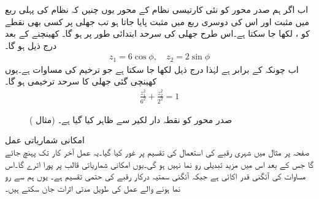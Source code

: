 اب اگر ہم صدر محور کو نئی کارتیسی نظام  کے محور یوں چنیں کہ  نظام کی پہلی ربع میں مثبت  اور اس کی دوسری ربع میں مثبت  پایا جاتا ہو تب جھلی پر کسی بھی نقطے کو ،  لکھا جا سکتا ہے۔اس طرح جھلی کی سرحد ابتدائی طور پر  ہو گا۔ کھینچنے کے بعد درج ذیل ہو گا۔
\begin{align*}
z_1=6\cos \phi,\quad z_2=2\sin \phi
\end{align*} 
اب چونکہ  کے برابر ہے لہٰذا درج ذیل لکھا جا سکتا ہے جو ترخیم کی مساوات ہے۔یوں کھینچی گئی جھلی کا سرحد ترخیمی ہو گا۔
\begin{align*}
\frac{z_1^2}{6^2}+\frac{z_2^2}{2^2}=1
\end{align*}
%
\begin{figure}
\centering
{}
\caption{صدر محور کو نقطہ دار لکیر سے ظاہر کیا گیا ہے۔ (مثال )}
\label{شکل_مثال_آئگنی_جھلی_صدر_محور}
\end{figure}
\quad امکانی شماریاتی عمل\\
صفحہ  پر مثال  میں  شہری رقبے کی استعمال کی تقسیم پر غور کیا گیا۔یہ عمل آخر کار   تک پہنچ جائے گا جس کے بعد اس میں مزید تبدیلی رو نما نہیں ہو گی۔یوں امکانی شماریاتی قالب  پر پورا اترے گا۔اس مساوات کی آئگنی قدر اکائی ہے جبکہ آئگنی سمتیہ  درکار رقبے کی حتمی تقسیم ہے۔ یوں ہم   سے رو نما ہونے والے عمل کی طویل مدتی اثرات جان سکتے ہیں۔ 

